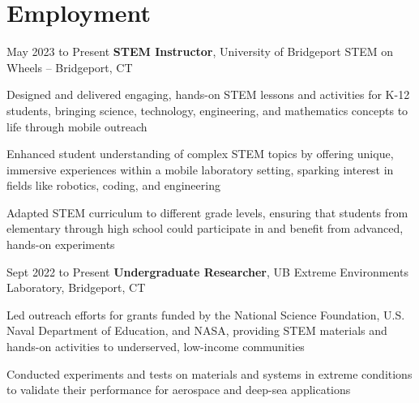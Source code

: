 \section{Employment}
    \begin{twocolentry}{
        May 2023 to Present
    }
        \textbf{STEM Instructor}, University of Bridgeport STEM on Wheels -- Bridgeport, CT\end{twocolentry}

    \vspace{0.10 cm}
    \begin{onecolentry}
        \begin{highlights}
          \item Designed and delivered engaging, hands-on STEM lessons and activities for K-12 students, bringing science, technology, engineering, and mathematics concepts to life through mobile outreach
          \item Enhanced student understanding of complex STEM topics by offering unique, immersive experiences within a mobile laboratory setting, sparking interest in fields like robotics, coding, and engineering
          \item Adapted STEM curriculum to different grade levels, ensuring that students from elementary through high school could participate in and benefit from advanced, hands-on experiments
        \end{highlights}
    \end{onecolentry}  
    
    \vspace{0.2 cm}
    
    \begin{twocolentry}{Sept 2022 to Present}
        \textbf{Undergraduate Researcher}, UB Extreme Environments Laboratory, Bridgeport, CT\end{twocolentry}

    \vspace{0.10 cm}
    \begin{onecolentry}
        \begin{highlights}
            \item Led outreach efforts for grants funded by the National Science Foundation, U.S. Naval Department of Education, and NASA, providing STEM materials and hands-on activities to underserved, low-income communities
            \item Conducted experiments and tests on materials and systems in extreme conditions to validate their performance for aerospace and deep-sea applications
        \end{highlights}
    \end{onecolentry}

